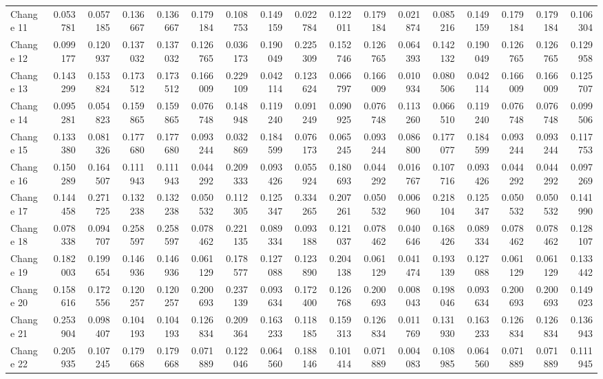 \documentclass{article}
\begin{document}
\begin{landscape}
\begin{table}[htbp]
\begin{tabular}{lrrrrrrrrrrrrrrrr}
Change 11 & 0.053781 & 0.057185 & 0.136667 & 0.136667 & 0.179184 & 0.108753 & 0.149159 & 0.022784 & 0.122011 & 0.179184 & 0.021874 & 0.085216 & 0.149159 & 0.179184 & 0.179184 & 0.106304 \\
Change 12 & 0.099177 & 0.120937 & 0.137032 & 0.137032 & 0.126765 & 0.036173 & 0.190049 & 0.225309 & 0.152746 & 0.126765 & 0.064393 & 0.142132 & 0.190049 & 0.126765 & 0.126765 & 0.129958 \\
Change 13 & 0.143299 & 0.153824 & 0.173512 & 0.173512 & 0.166009 & 0.229109 & 0.042114 & 0.123624 & 0.066797 & 0.166009 & 0.010934 & 0.080506 & 0.042114 & 0.166009 & 0.166009 & 0.125707 \\
Change 14 & 0.095281 & 0.054823 & 0.159865 & 0.159865 & 0.076748 & 0.148948 & 0.119240 & 0.091249 & 0.090925 & 0.076748 & 0.113260 & 0.066510 & 0.119240 & 0.076748 & 0.076748 & 0.099506 \\
Change 15 & 0.133380 & 0.081326 & 0.177680 & 0.177680 & 0.093244 & 0.032869 & 0.184599 & 0.076173 & 0.065245 & 0.093244 & 0.086800 & 0.177077 & 0.184599 & 0.093244 & 0.093244 & 0.117753 \\
Change 16 & 0.150289 & 0.164507 & 0.111943 & 0.111943 & 0.044292 & 0.209333 & 0.093426 & 0.055924 & 0.180693 & 0.044292 & 0.016767 & 0.107716 & 0.093426 & 0.044292 & 0.044292 & 0.097269 \\
Change 17 & 0.144458 & 0.271725 & 0.132238 & 0.132238 & 0.050532 & 0.112305 & 0.125347 & 0.334265 & 0.207261 & 0.050532 & 0.006960 & 0.218104 & 0.125347 & 0.050532 & 0.050532 & 0.141990 \\
Change 18 & 0.078338 & 0.094707 & 0.258597 & 0.258597 & 0.078462 & 0.221135 & 0.089334 & 0.093188 & 0.121037 & 0.078462 & 0.040646 & 0.168426 & 0.089334 & 0.078462 & 0.078462 & 0.128107 \\
Change 19 & 0.182003 & 0.199654 & 0.146936 & 0.146936 & 0.061129 & 0.178577 & 0.127088 & 0.123890 & 0.204138 & 0.061129 & 0.041474 & 0.193139 & 0.127088 & 0.061129 & 0.061129 & 0.133442 \\
Change 20 & 0.158616 & 0.172556 & 0.120257 & 0.120257 & 0.200693 & 0.237139 & 0.093634 & 0.172400 & 0.126768 & 0.200693 & 0.008043 & 0.198046 & 0.093634 & 0.200693 & 0.200693 & 0.149023 \\
Change 21 & 0.253904 & 0.098407 & 0.104193 & 0.104193 & 0.126834 & 0.209364 & 0.163233 & 0.118185 & 0.159313 & 0.126834 & 0.011769 & 0.131930 & 0.163233 & 0.126834 & 0.126834 & 0.136943 \\
Change 22 & 0.205935 & 0.107245 & 0.179668 & 0.179668 & 0.071889 & 0.122046 & 0.064560 & 0.188146 & 0.101414 & 0.071889 & 0.004083 & 0.108985 & 0.064560 & 0.071889 & 0.071889 & 0.111945 \\

\end{tabular}
\end{table}
\end{landscape}
\end{document}
